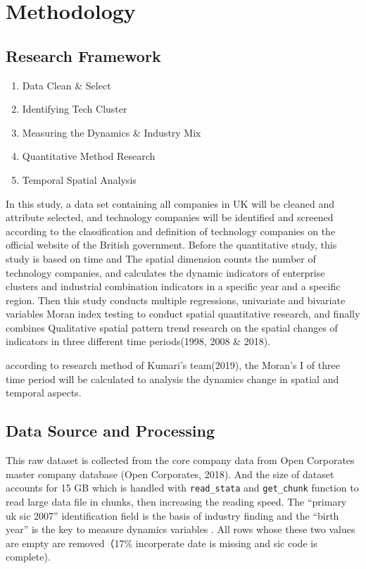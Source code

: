 \documentclass[
  12pt,
  oneside]{book}
\providecommand{\tightlist}{%
  \setlength{\itemsep}{0pt}\setlength{\parskip}{0pt}}
\begin{document}
\hypertarget{methodology}{%
\chapter{Methodology}\label{methodology}}

\hypertarget{research-framework}{%
\section{Research Framework}\label{research-framework}}

\begin{enumerate}
\def\labelenumi{\arabic{enumi}.}
\tightlist
\item
  Data Clean \& Select
\item
  Identifying Tech Cluster
\item
  Measuring the Dynamics \& Industry Mix
\item
  Quantitative Method Research
\item
  Temporal Spatial Analysis
\end{enumerate}

In this study, a data set containing all companies in UK will be cleaned and attribute selected, and technology companies will be identified and screened according to the classification and definition of technology companies on the official website of the British government. Before the quantitative study, this study is based on time and The spatial dimension counts the number of technology companies, and calculates the dynamic indicators of enterprise clusters and industrial combination indicators in a specific year and a specific region. Then this study conducts multiple regressions, univariate and bivariate variables Moran index testing to conduct spatial quantitative research, and finally combines Qualitative spatial pattern trend research on the spatial changes of indicators in three different time periods(1998, 2008 \& 2018).

according to research method of Kumari's team(2019), the Moran's I of three time period will be calculated to analysis the dynamics change in spatial and temporal aspects.

\hypertarget{data-source-and-processing}{%
\section{Data Source and Processing}\label{data-source-and-processing}}

This raw dataset is collected from the core company data from Open Corporates master company database (Open Corporates, 2018). And the size of dataset accounts for 15 GB which is handled with \texttt{read\_stata} and \texttt{get\_chunk} function to read large data file in chunks, then increasing the reading speed. The ``primary uk sic 2007'' identification field is the basis of industry finding and the ``birth year'' is the key to measure dynamics variables . All rows whose these two values are empty are removed（17\% incorperate date is missing and sic code is complete).
\end{document}
